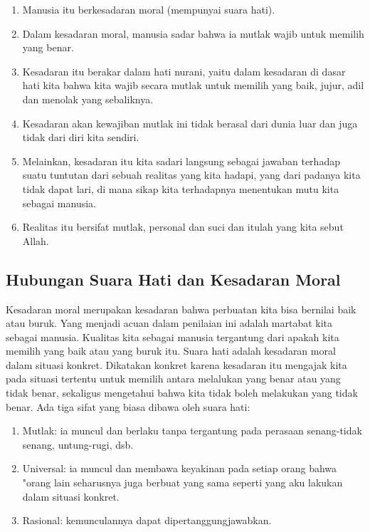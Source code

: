 \documentclass[11pt,twoside,a5paper,openany]{memoir}
\def\tightlist{}
\begin{document}
\begin{enumerate}
\def\labelenumi{\arabic{enumi}.}
\tightlist
\item
  Manusia itu berkesadaran moral (mempunyai suara hati).
\item
  Dalam kesadaran moral, manusia sadar bahwa ia mutlak wajib untuk
  memilih yang benar.
\item
  Kesadaran itu berakar dalam hati nurani, yaitu dalam kesadaran di
  dasar hati kita bahwa kita wajib secara mutlak untuk memilih yang
  baik, jujur, adil dan menolak yang sebaliknya.
\item
  Kesadaran akan kewajiban mutlak ini tidak berasal dari dunia luar dan
  juga tidak dari diri kita sendiri.
\item
  Melainkan, kesadaran itu kita sadari langsung sebagai jawaban terhadap
  suatu tuntutan dari sebuah realitas yang kita hadapi, yang dari
  padanya kita tidak dapat lari, di mana sikap kita terhadapnya
  menentukan mutu kita sebagai manusia.
\item
  Realitas itu bersifat mutlak, personal dan suci dan itulah yang kita
  sebut Allah.
\end{enumerate}

\hypertarget{hubungan-suara-hati-dan-kesadaran-moral}{%
\subsection{Hubungan Suara Hati dan Kesadaran
Moral}\label{hubungan-suara-hati-dan-kesadaran-moral}}

Kesadaran moral merupakan kesadaran bahwa perbuatan kita bisa bernilai
baik atau buruk. Yang menjadi acuan dalam penilaian ini adalah martabat
kita sebagai manusia. Kualitas kita sebagai manusia tergantung dari
apakah kita memilih yang baik atau yang buruk itu. Suara hati adalah
kesadaran moral dalam situasi konkret. Dikatakan konkret karena
kesadaran itu mengajak kita pada situasi tertentu untuk memilih antara
melalukan yang benar atau yang tidak benar, sekaligus mengetahui bahwa
kita tidak boleh melakukan yang tidak benar. Ada tiga sifat yang biasa
dibawa oleh suara hati:

\begin{enumerate}
\def\labelenumi{\arabic{enumi}.}
\tightlist
\item
  Mutlak: ia muncul dan berlaku tanpa tergantung pada perasaan
  senang-tidak senang, untung-rugi, dsb.
\item
  Universal: ia muncul dan membawa keyakinan pada setiap orang bahwa
  "orang lain seharusnya juga berbuat yang sama seperti yang aku lakukan
  dalam situasi konkret.
\item
  Rasional: kemunculannya dapat dipertanggungjawabkan.
\end{enumerate}
\end{document}
